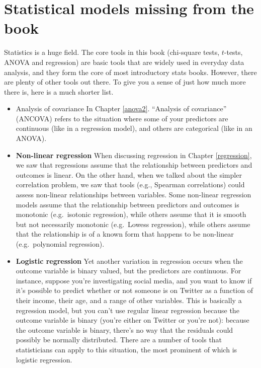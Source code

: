 \documentclass[
]{book}
\theoremstyle{definition}
\theoremstyle{definition}
\theoremstyle{definition}
\theoremstyle{definition}
\theoremstyle{remark}
\begin{document}
\hypertarget{statistical-models-missing-from-the-book}{%
\section*{Statistical models missing from the book}\label{statistical-models-missing-from-the-book}}

Statistics is a huge field. The core tools in this book (chi-square tests, \(t\)-tests, ANOVA and regression) are basic tools that are widely used in everyday data analysis, and they form the core of most introductory stats books. However, there are plenty of other tools out there. To give you a sense of just how much more there is, here is a much shorter list.

\begin{itemize}
\item
  Analysis of covariance In Chapter \ref{anova2}. ``Analysis of covariance'' (ANCOVA) refers to the situation where some of your predictors are continuous (like in a regression model), and others are categorical (like in an ANOVA).
\item
  \textbf{Non-linear regression} When discussing regression in Chapter \ref{regression}, we saw that regressions assume that the relationship between predictors and outcomes is linear. On the other hand, when we talked about the simpler correlation problem, we saw that tools (e.g., Spearman correlations) could assess non-linear relationships between variables. Some non-linear regression models assume that the relationship between predictors and outcomes is monotonic (e.g.~isotonic regression), while others assume that it is smooth but not necessarily monotonic (e.g.~Lowess regression), while others assume that the relationship is of a known form that happens to be non-linear (e.g.~polynomial regression).
\item
  \textbf{Logistic regression} Yet another variation in regression occurs when the outcome variable is binary valued, but the predictors are continuous. For instance, suppose you're investigating social media, and you want to know if it's possible to predict whether or not someone is on Twitter as a function of their income, their age, and a range of other variables. This is basically a regression model, but you can't use regular linear regression because the outcome variable is binary (you're either on Twitter or you're not): because the outcome variable is binary, there's no way that the residuals could possibly be normally distributed. There are a number of tools that statisticians can apply to this situation, the most prominent of which is logistic regression.

\end{itemize}
\end{document}
